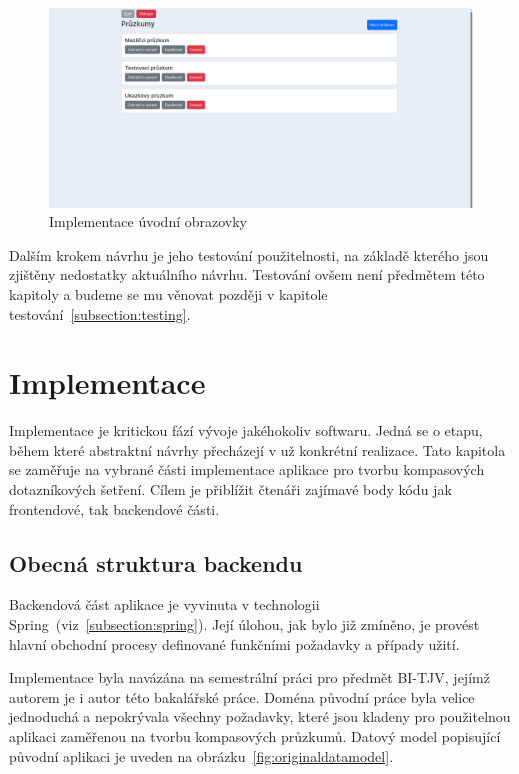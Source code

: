 \begin{figure}[h!]
    \centering
    \includegraphics[width=\textwidth]{images/surveylistImpl.png}
    \caption{Implementace úvodní obrazovky}
    \label{fig:homescreenImplementation}
\end{figure}

Dalším krokem návrhu je jeho testování použitelnosti, na základě kterého jsou zjištěny nedostatky aktuálního
návrhu. Testování ovšem není předmětem této kapitoly a budeme se mu věnovat později v kapitole testování~\ref{subsection:testing}.

\chapter{Implementace}
Implementace je kritickou fází vývoje jakéhokoliv softwaru. Jedná se o etapu,
během které abstraktní návrhy přecházejí v už konkrétní realizace. 
Tato kapitola se zaměřuje na vybrané části implementace aplikace pro tvorbu
kompasových dotazníkových šetření. Cílem je přiblížit čtenáři zajímavé body kódu jak
frontendové, tak backendové části. 

\section{Obecná struktura backendu}
Backendová část aplikace je vyvinuta v technologii Spring~(viz~\ref{subsection:spring}).
Její úlohou, jak bylo již zmíněno, je provést hlavní obchodní procesy definované funkčními
požadavky a případy užití.

Implementace byla navázána na semestrální práci pro předmět BI-TJV, jejímž
autorem je i autor této bakalářské práce. Doména původní práce byla velice jednoduchá a 
nepokrývala všechny požadavky, které jsou kladeny pro použitelnou aplikaci zaměřenou
na tvorbu kompasových průzkumů. Datový model popisující původní aplikaci je uveden na
obrázku~\ref{fig:originaldatamodel}.

